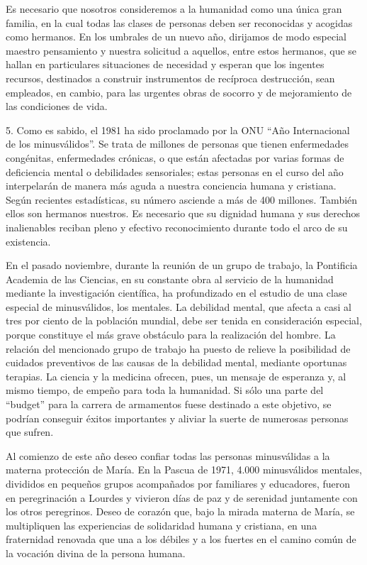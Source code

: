 Es necesario que nosotros consideremos a la humanidad como una única
gran familia, en la cual todas las clases de personas deben ser
reconocidas y acogidas como hermanos. En los umbrales de un nuevo año,
dirijamos de modo especial maestro pensamiento y nuestra solicitud a
aquellos, entre estos hermanos, que se hallan en particulares
situaciones de necesidad y esperan que los ingentes recursos, destinados
a construir instrumentos de recíproca destrucción, sean empleados, en
cambio, para las urgentes obras de socorro y de mejoramiento de las
condiciones de vida.

5. Como es sabido, el 1981 ha sido proclamado por la ONU ``Año
Internacional de los minusválidos''. Se trata de millones de personas
que tienen enfermedades congénitas, enfermedades crónicas, o que están
afectadas por varias formas de deficiencia mental o debilidades
sensoriales; estas personas en el curso del año interpelarán de manera
más aguda a nuestra conciencia humana y cristiana. Según recientes
estadísticas, su número asciende a más de 400 millones. También ellos
son hermanos nuestros. Es necesario que su dignidad humana y sus
derechos inalienables reciban pleno y efectivo reconocimiento durante
todo el arco de su existencia.

En el pasado noviembre, durante la reunión de un grupo de trabajo, la
Pontificia Academia de las Ciencias, en su constante obra al servicio de
la humanidad mediante la investigación científica, ha profundizado en el
estudio de una clase especial de minusválidos, los mentales. La
debilidad mental, que afecta a casi al tres por ciento de la población
mundial, debe ser tenida en consideración especial, porque constituye el
más grave obstáculo para la realización del hombre. La relación del
mencionado grupo de trabajo ha puesto de relieve la posibilidad de
cuidados preventivos de las causas de la debilidad mental, mediante
oportunas terapias. La ciencia y la medicina ofrecen, pues, un mensaje
de esperanza y, al mismo tiempo, de empeño para toda la humanidad. Si
sólo una parte del ``budget'' para la carrera de armamentos fuese
destinado a este objetivo, se podrían conseguir éxitos importantes y
aliviar la suerte de numerosas personas que sufren.

Al comienzo de este año deseo confiar todas las personas minusválidas a
la materna protección de María. En la Pascua de 1971, 4.000 minusválidos
mentales, divididos en pequeños grupos acompañados por familiares y
educadores, fueron en peregrinación a Lourdes y vivieron días de paz y
de serenidad juntamente con los otros peregrinos. Deseo de corazón que,
bajo la mirada materna de María, se multipliquen las experiencias de
solidaridad humana y cristiana, en una fraternidad renovada que una a
los débiles y a los fuertes en el camino común de la vocación divina de
la persona humana.

